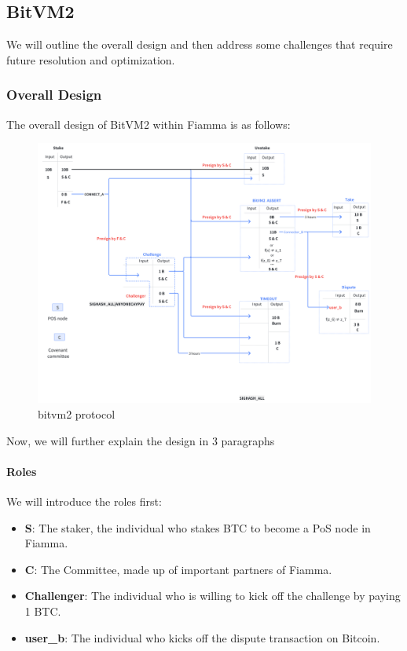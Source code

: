 \subsection{BitVM2}

We will outline the overall design and then address some challenges that require future resolution and optimization.

\subsubsection{Overall Design}

The overall design of BitVM2 within Fiamma is as follows:

\begin{figure}[ht] 
    \centering  
    \includegraphics[width=0.85\columnwidth]{images/bitvm2 protocol.png} 
    \caption{bitvm2 protocol}
    \label{fig:bitvm2 protocol}
\end{figure}

Now, we will further explain the design in 3 paragraphs

\paragraph{Roles}

We will introduce the roles first:

\begin{itemize}
    \item \textbf{S}: The staker, the individual who stakes BTC to become a PoS node in Fiamma.
    \item \textbf{C}: The Committee, made up of important partners of Fiamma.
    \item \textbf{Challenger}: The individual who is willing to kick off the challenge by paying 1 BTC.
    \item \textbf{user\_b}: The individual who kicks off the dispute transaction on Bitcoin.
\end{itemize}

